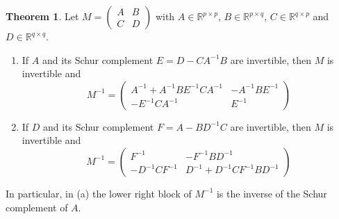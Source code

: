 \documentclass[12pt]{article}
\newcommand{\R}{\mathbb R}
\theoremstyle{definition}
\newtheorem{theorem}{Theorem}
\begin{document}
\begin{theorem}\label{r5b-thm-partitioned-inverse}
Let \(M=\begin{pmatrix}A&B\\C&D\end{pmatrix}\) with \(A\in\R^{p\times p}\), \(B\in\R^{p\times q}\),
\(C\in\R^{q\times p}\) and \(D\in\R^{q\times q}\).
\begin{enumerate}
\item If \(A\) and its Schur complement \(E=D-CA^{-1}B\) are invertible, then \(M\) is invertible and
\[
M^{-1}=\begin{pmatrix}A^{-1}+A^{-1}BE^{-1}CA^{-1}&-A^{-1}BE^{-1}\\-E^{-1}CA^{-1}&E^{-1}\end{pmatrix}
\]
\item If \(D\) and its Schur complement \(F=A-BD^{-1}C\) are invertible, then \(M\) is invertible and
\[
M^{-1}=\begin{pmatrix}F^{-1}&-F^{-1}BD^{-1}\\-D^{-1}CF^{-1}&D^{-1}+D^{-1}CF^{-1}BD^{-1}\end{pmatrix}
\]
\end{enumerate}
In particular, in (a) the lower right block of \(M^{-1}\) is the inverse of the Schur complement of \(A\).
\end{theorem}
\end{document}
